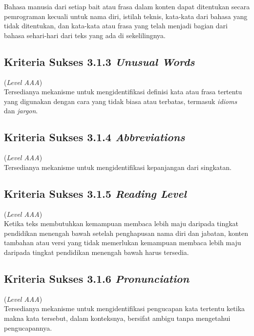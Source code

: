 Bahasa manusia dari setiap bait atau frasa dalam konten dapat ditentukan secara pemrograman kecuali untuk nama diri, istilah teknis, kata-kata dari bahasa yang tidak ditentukan, dan kata-kata atau frasa yang telah menjadi bagian dari bahasa sehari-hari dari teks yang ada di sekelilingnya.

\subsection{Kriteria Sukses 3.1.3 \textit{Unusual Words}}
\label{subsec:kriteria_3.1.3}
(\textit{Level AAA}) \\

Tersedianya mekanisme untuk mengidentifikasi definisi kata atau frasa tertentu yang digunakan dengan cara yang tidak biasa atau terbatas, termasuk \textit{idioms} dan \textit{jargon}.

\subsection{Kriteria Sukses 3.1.4 \textit{Abbreviations}}
\label{subsec:kriteria_3.1.4}
(\textit{Level AAA}) \\

Tersedianya mekanisme untuk mengidentifikasi kepanjangan dari singkatan.

\subsection{Kriteria Sukses 3.1.5 \textit{Reading Level}}
\label{subsec:kriteria_3.1.5}
(\textit{Level AAA}) \\

Ketika teks membutuhkan kemampuan membaca lebih maju daripada tingkat pendidikan menengah bawah setelah penghapusan nama diri dan jabatan, konten tambahan atau versi yang tidak memerlukan kemampuan membaca lebih maju daripada tingkat pendidikan menengah bawah harus tersedia.

\subsection{Kriteria Sukses 3.1.6 \textit{Pronunciation}}
\label{subsec:kriteria_3.1.6}
(\textit{Level AAA}) \\

Tersedianya mekanisme untuk mengidentifikasi pengucapan kata tertentu ketika makna kata tersebut, dalam konteksnya, bersifat ambigu tanpa mengetahui pengucapannya.

